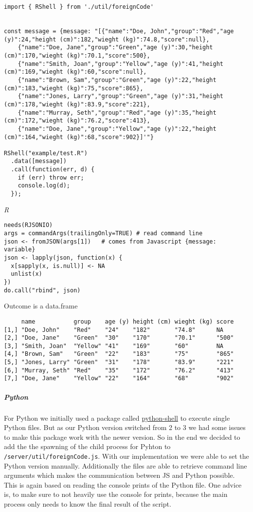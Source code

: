 \documentclass[]{article}
\let\oldsubparagraph\subparagraph
\renewcommand{\subparagraph}[1]{\oldsubparagraph{#1}\mbox{}}
\begin{document}
\begin{verbatim}
import { RShell } from './util/foreignCode'


const message = {message: "[{"name":"Doe, John","group":"Red","age (y)":24,"height (cm)":182,"wieght (kg)":74.8,"score":null},
    {"name":"Doe, Jane","group":"Green","age (y)":30,"height (cm)":170,"wieght (kg)":70.1,"score":500},
    {"name":"Smith, Joan","group":"Yellow","age (y)":41,"height (cm)":169,"wieght (kg)":60,"score":null},
    {"name":"Brown, Sam","group":"Green","age (y)":22,"height (cm)":183,"wieght (kg)":75,"score":865},
    {"name":"Jones, Larry","group":"Green","age (y)":31,"height (cm)":178,"wieght (kg)":83.9,"score":221},
    {"name":"Murray, Seth","group":"Red","age (y)":35,"height (cm)":172,"wieght (kg)":76.2,"score":413},
    {"name":"Doe, Jane","group":"Yellow","age (y)":22,"height (cm)":164,"wieght (kg)":68,"score":902}]'"}

RShell("example/test.R")
  .data([message])
  .call(function(err, d) {
    if (err) throw err;
    console.log(d);
  });
\end{verbatim}

\emph{R}

\begin{verbatim}
needs(RJSONIO)   
args = commandArgs(trailingOnly=TRUE) # read command line
json <- fromJSON(args[1])   # comes from Javascript {message: variable}
json <- lapply(json, function(x) {
  x[sapply(x, is.null)] <- NA
  unlist(x)
})
do.call("rbind", json)
\end{verbatim}

Outcome is a data.frame

\begin{verbatim}
     name           group    age (y) height (cm) wieght (kg) score
[1,] "Doe, John"    "Red"    "24"    "182"       "74.8"      NA   
[2,] "Doe, Jane"    "Green"  "30"    "170"       "70.1"      "500"
[3,] "Smith, Joan"  "Yellow" "41"    "169"       "60"        NA   
[4,] "Brown, Sam"   "Green"  "22"    "183"       "75"        "865"
[5,] "Jones, Larry" "Green"  "31"    "178"       "83.9"      "221"
[6,] "Murray, Seth" "Red"    "35"    "172"       "76.2"      "413"
[7,] "Doe, Jane"    "Yellow" "22"    "164"       "68"        "902"
\end{verbatim}

\subparagraph{Python}\label{python}

For Python we initially used a package called
\href{https://github.com/extrabacon/python-shell}{python-shell} to
execute single Python files. But as our Python version switched from 2
to 3 we had some issues to make this package work with the newer
version. So in the end we decided to add the the spawning of the child
process for Pyhton to \texttt{/server/util/foreignCode.js}. With our
implementation we were able to set the Python version manually.
Additionally the files are able to retrieve command line arguments which
makes the communication between JS and Python possible. This is again
based on reading the console prints of the Python file. One advice is,
to make sure to not heavily use the console for prints, because the main
process only needs to know the final result of the script.
\end{document}
